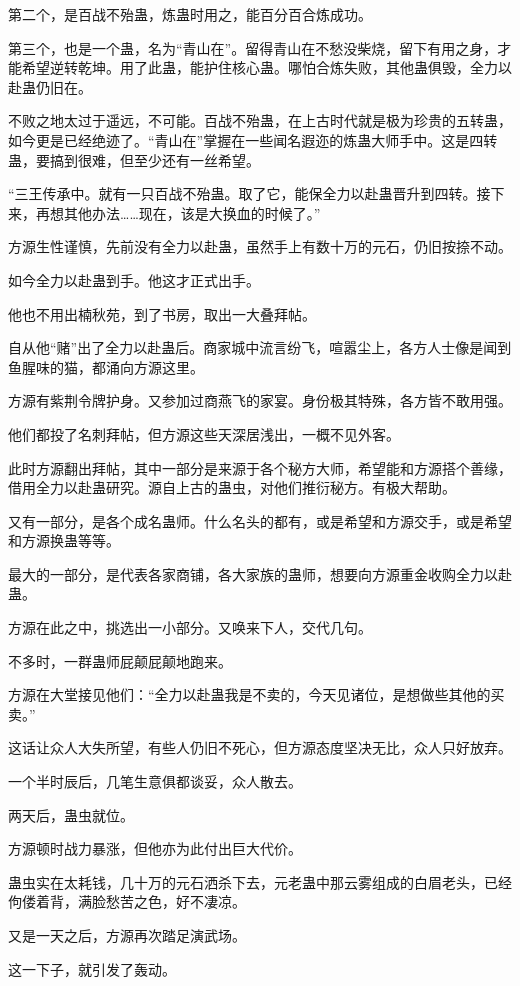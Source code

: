 \begin{this_body}
第二个，是百战不殆蛊，炼蛊时用之，能百分百合炼成功。

第三个，也是一个蛊，名为“青山在”。留得青山在不愁没柴烧，留下有用之身，才能希望逆转乾坤。用了此蛊，能护住核心蛊。哪怕合炼失败，其他蛊俱毁，全力以赴蛊仍旧在。

不败之地太过于遥远，不可能。百战不殆蛊，在上古时代就是极为珍贵的五转蛊，如今更是已经绝迹了。“青山在”掌握在一些闻名遐迩的炼蛊大师手中。这是四转蛊，要搞到很难，但至少还有一丝希望。

“三王传承中。就有一只百战不殆蛊。取了它，能保全力以赴蛊晋升到四转。接下来，再想其他办法……现在，该是大换血的时候了。”

方源生性谨慎，先前没有全力以赴蛊，虽然手上有数十万的元石，仍旧按捺不动。

如今全力以赴蛊到手。他这才正式出手。

他也不用出楠秋苑，到了书房，取出一大叠拜帖。

自从他“赌”出了全力以赴蛊后。商家城中流言纷飞，喧嚣尘上，各方人士像是闻到鱼腥味的猫，都涌向方源这里。

方源有紫荆令牌护身。又参加过商燕飞的家宴。身份极其特殊，各方皆不敢用强。

他们都投了名刺拜帖，但方源这些天深居浅出，一概不见外客。

此时方源翻出拜帖，其中一部分是来源于各个秘方大师，希望能和方源搭个善缘，借用全力以赴蛊研究。源自上古的蛊虫，对他们推衍秘方。有极大帮助。

又有一部分，是各个成名蛊师。什么名头的都有，或是希望和方源交手，或是希望和方源换蛊等等。

最大的一部分，是代表各家商铺，各大家族的蛊师，想要向方源重金收购全力以赴蛊。

方源在此之中，挑选出一小部分。又唤来下人，交代几句。

不多时，一群蛊师屁颠屁颠地跑来。

方源在大堂接见他们：“全力以赴蛊我是不卖的，今天见诸位，是想做些其他的买卖。”

这话让众人大失所望，有些人仍旧不死心，但方源态度坚决无比，众人只好放弃。

一个半时辰后，几笔生意俱都谈妥，众人散去。

两天后，蛊虫就位。

方源顿时战力暴涨，但他亦为此付出巨大代价。

蛊虫实在太耗钱，几十万的元石洒杀下去，元老蛊中那云雾组成的白眉老头，已经佝偻着背，满脸愁苦之色，好不凄凉。

又是一天之后，方源再次踏足演武场。

这一下子，就引发了轰动。


\end{this_body}
